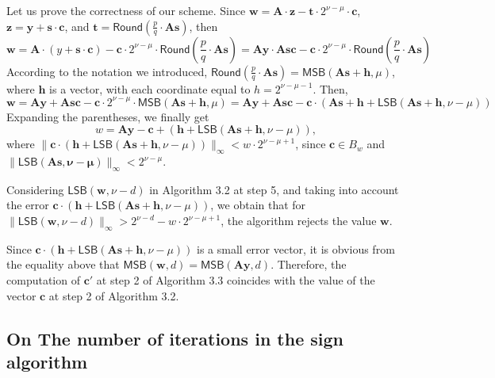 \documentclass{article}
\theoremstyle{plain}
\theoremstyle{definition}
\begin{document}
    Let us prove the correctness of our scheme. Since $\mathbf{w} = \mathbf{A} \cdot \mathbf{z} - \mathbf{t} \cdot 2^{\nu - \mu} \cdot \mathbf{c}$, $\mathbf{z} = \mathbf{y} + \mathbf{s} \cdot \mathbf{c}$, and $\mathbf{t} = \mathsf{Round}\left(\frac{p}{q} \cdot \mathbf{As}\right)$, then
    $$
        \mathbf{w} = \mathbf{A} \cdot (y + \mathbf{s} \cdot \mathbf{c}) - \mathbf{c} \cdot 2^{\nu - \mu} \cdot \mathsf{Round}\left(\frac{p}{q} \cdot \mathbf{As}\right) = \mathbf{Ay} \cdot \mathbf{Asc} - \mathbf{c} \cdot 2^{\nu -\mu} \cdot \mathsf{Round}\left(\frac{p}{q} \cdot \mathbf{As}\right)
    $$
    According to the notation we introduced, $\mathsf{Round}\left(\frac{p}{q} \cdot \mathbf{As}\right) = \mathsf{MSB}(\mathbf{As} + \mathbf{h}, \mu)$, where $\mathbf{h}$ is a vector, with each coordinate equal to $h = 2^{\nu - \mu - 1}$. Then,
    $$
        \mathbf{w} = \mathbf{Ay} + \mathbf{Asc} - \mathbf{c} \cdot 2^{\nu - \mu} \cdot \mathsf{MSB}(\mathbf{As} + \mathbf{h}, \mu) = \mathbf{Ay} + \mathbf{Asc} - \mathbf{c} \cdot (\mathbf{As} + \mathbf{h} + \mathsf{LSB}(\mathbf{As} + \mathbf{h}, \nu - \mu))
    $$
    Expanding the parentheses, we finally get
    $$
    w = \mathbf{Ay} - \mathbf{c} + (\mathbf{h} + \mathsf{LSB}(\mathbf{As} + \mathbf{h}, \nu - \mu)),
    $$
    where $\|\mathbf{c} \cdot (\mathbf{h} + \mathsf{LSB}(\mathbf{As} + \mathbf{h}, \nu - \mu))\|_{\infty} < w\cdot 2^{\nu - \mu + 1}$, since $\mathbf{c} \in B_w$ and $\|\mathsf{LSB}(\mathbf{As, \nu - \mu})\|_{\infty} < 2^{\nu - \mu}$.

    Considering $\mathsf{LSB}(\mathbf{w}, \nu - d)$ in Algorithm 3.2 at step 5, and taking into account the error $\mathbf{c} \cdot (\mathbf{h} + \mathsf{LSB} (\mathbf{As} + \mathbf{h}, \nu - \mu))$, we obtain that for $\|\mathsf{LSB}(\mathbf{w}, \nu-d)\|_{\infty} > 2^{\nu - d} - w \cdot 2^{\nu - \mu +1}$, the algorithm rejects the value $\mathbf{w}$.

    Since $\mathbf{c} \cdot (\mathbf{h} + \mathsf{LSB}(\mathbf{As} + \mathbf{h}, \nu - \mu))$ is a small error vector, it is obvious from the equality above that $\mathsf{MSB}(\mathbf{w}, d) = \mathsf{MSB}(\mathbf{Ay}, d)$. Therefore, the computation of $\mathbf{c}'$ at step 2 of Algorithm 3.3 coincides with the value of the vector $\mathbf{c}$ at step 2 of Algorithm 3.2.
    
    \subsection{On The number of iterations in the sign algorithm}
    \label{sec:iterations}
\end{document}
